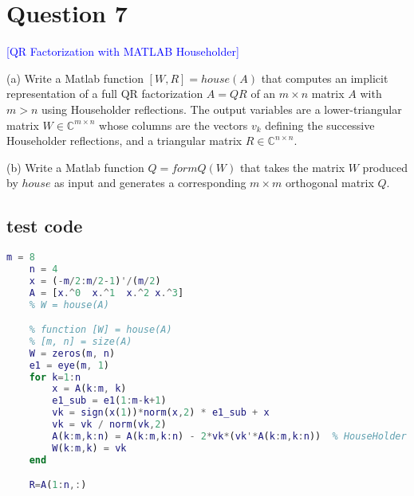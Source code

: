 \section*{Question 7}
\textcolor{blue}{[QR Factorization with MATLAB Householder]} 

(a) Write a Matlab function $[W,R] = house(A)$ that computes an implicit representation of a full QR factorization 
$A = QR$ of an $m \times n$ matrix $A$ with $m > n$ using Householder reflections. 
The output variables are a lower-triangular matrix $W \in \mathbb{C}^{m \times n}$ 
whose columns are the vectors $v_k$ defining the successive Householder reflections, 
and a triangular matrix $R \in \mathbb{C}^{n \times n}$.

(b) Write a Matlab function $Q = formQ(W)$ that takes 
the matrix $W$ produced by $house$ as input 
and generates a corresponding $m \times m$ orthogonal matrix $Q$.

\subsection*{test code}

% 
\begin{lstlisting}[language=matlab]
    m = 8
    n = 4
    x = (-m/2:m/2-1)'/(m/2)
    A = [x.^0  x.^1  x.^2 x.^3]
    % W = house(A)

    % function [W] = house(A)
    % [m, n] = size(A)
    W = zeros(m, n)
    e1 = eye(m, 1)
    for k=1:n
        x = A(k:m, k)
        e1_sub = e1(1:m-k+1)
        vk = sign(x(1))*norm(x,2) * e1_sub + x
        vk = vk / norm(vk,2)
        A(k:m,k:n) = A(k:m,k:n) - 2*vk*(vk'*A(k:m,k:n))  % HouseHolder mapping; 
        W(k:m,k) = vk
    end

    R=A(1:n,:)
\end{lstlisting}